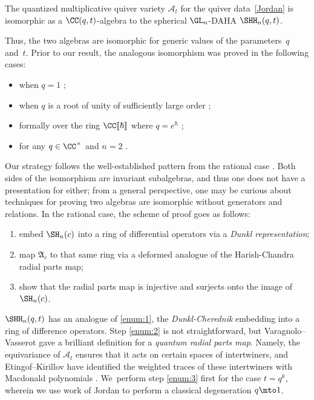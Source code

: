 \begin{main}
The quantized multiplicative quiver variety $\mathcal{A}_t$ for the quiver data~\eqref{Jordan} is isomorphic as a $\CC(q,t)$-algebra to the spherical $\GL_n$-DAHA $\SHH_n(q,t)$.
\end{main}

Thus, the two algebras are isomorphic for generic values of the parameters~$q$ and~$t$.
Prior to our result, the analogous isomorphism was proved in the following cases:
\begin{itemize}
\item when $q=1$ \cite{ObDAHA};
\item when $q$ is a root of unity of sufficiently large order \cite{VarVassRoot};
\item formally over the ring $\CC[\![\hbar]\!]$ where $q=e^\hbar$ \cite{JordanMult};
\item for any $q\in\CC^\times$ and $n=2$ \cite{BalJor}.
\end{itemize}

Our strategy follows the well-established pattern from the rational case \cite{GanGinz, EGGO}.
Both sides of the isomorphism are invariant subalgebras, and thus one does not have a presentation for either; from a general perspective, one may be curious about techniques for proving two algebras are isomorphic without generators and relations.
In the rational case, the scheme of proof goes as follows:
\begin{enumerate}
\item\label{enum:1} embed $\SH_n(c)$ into a ring of differential operators via a \textit{Dunkl representation};
\item\label{enum:2} map $\mathfrak{A}_c$ to that same ring via a deformed analogue of the Harish-Chandra radial parts map;
\item\label{enum:3} show that the radial parts map is injective and surjects onto the image of $\SH_n(c)$.
\end{enumerate}
$\SHH_n(q,t)$ has an analogue of \eqref{enum:1}, the \textit{Dunkl-Cherednik} embedding into a ring of difference operators.
Step \eqref{enum:2} is not straightforward, but Varagnolo--Vasserot \cite{VarVassRoot} gave a brilliant definition for a \textit{quantum radial parts map}.
Namely, the equivariance of $\mathcal{A}_t$ ensures that it acts on certain spaces of intertwiners, and Etingof--Kirillov have identified the weighted traces of these intertwiners with Macdonald polynomials \cite{EtKirQuant}. We~perform step \eqref{enum:3} first for the case $t=q^k$, wherein we use work of Jordan \cite{JordanMult} to perform a classical degeneration $q\mto 1$.


